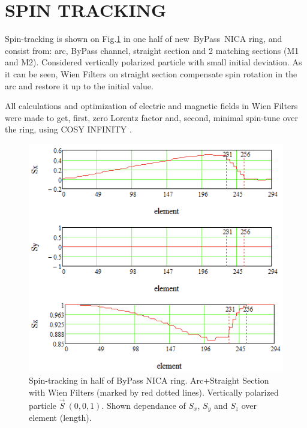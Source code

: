 \documentclass[a4paper,
               keeplastbox,   %
               ]{jacow}
\begin{document}
\section{SPIN TRACKING}

\par Spin-tracking is shown on Fig.\ref{fig:spin} in one half of new~ByPass~NICA ring, and consist from: arc, ByPass channel, straight section and 2 matching sections (M1 and M2). Considered vertically polarized particle with small initial deviation. As it can be seen, Wien Filters on straight section compensate spin rotation in the arc and restore it up to the initial value.
\par All calculations and optimization of electric and magnetic fields in Wien Filters were made to get, first, zero Lorentz factor and, second, minimal spin-tune over the ring, using COSY INFINITY \cite{COSY}.
\newline \newline

\begin{figure}
   \centering
   \includegraphics*[width=1.\columnwidth]{img/MOPA072_f8-1}
   \caption{Spin-tracking in half of ByPass NICA ring. Arc+Straight Section with Wien Filters (marked by red dotted lines). Vertically polarized particle $\vec{S}~(0,0,1)$. Shown dependance of $S_{x}$, $S_{y}$ and $S_{z}$ over element (length).}
   \label{fig:spin}
\end{figure}
\end{document}

